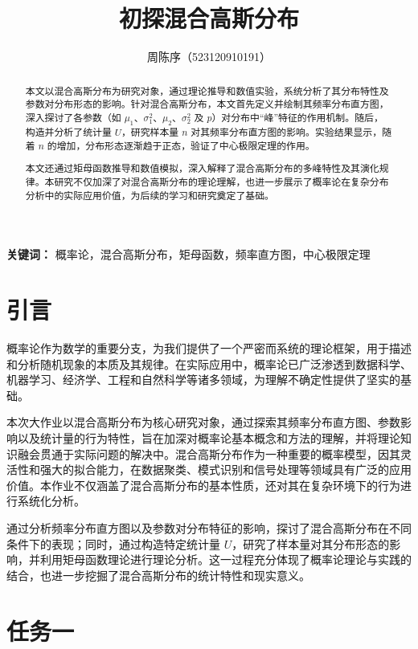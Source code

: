 \documentclass{article}
\title{初探混合高斯分布}
\author{周陈序（523120910191）}
\newcommand{\keywords}[1]{\textbf{关键词：} #1}
\begin{document}
\maketitle

\renewcommand{\abstractname}{摘要} %
\begin{abstract}

本文以混合高斯分布为研究对象，通过理论推导和数值实验，系统分析了其分布特性及参数对分布形态的影响。针对混合高斯分布，本文首先定义并绘制其频率分布直方图，深入探讨了各参数（如 \(\mu_1\)、\(\sigma_1^2\)、\(\mu_2\)、\(\sigma_2^2\) 及 \(p\)）对分布中“峰”特征的作用机制。随后，构造并分析了统计量 \( U \)，研究样本量 \( n \) 对其频率分布直方图的影响。实验结果显示，随着 \( n \) 的增加，分布形态逐渐趋于正态，验证了中心极限定理的作用。

本文还通过矩母函数推导和数值模拟，深入解释了混合高斯分布的多峰特性及其演化规律。本研究不仅加深了对混合高斯分布的理论理解，也进一步展示了概率论在复杂分布分析中的实际应用价值，为后续的学习和研究奠定了基础。

\end{abstract}

\keywords{概率论，混合高斯分布，矩母函数，频率直方图，中心极限定理}

\newpage
\tableofcontents
\newpage

\section{引言}

概率论作为数学的重要分支，为我们提供了一个严密而系统的理论框架，用于描述和分析随机现象的本质及其规律。在实际应用中，概率论已广泛渗透到数据科学、机器学习、经济学、工程和自然科学等诸多领域，为理解不确定性提供了坚实的基础。

本次大作业以混合高斯分布为核心研究对象，通过探索其频率分布直方图、参数影响以及统计量的行为特性，旨在加深对概率论基本概念和方法的理解，并将理论知识融会贯通于实际问题的解决中。混合高斯分布作为一种重要的概率模型，因其灵活性和强大的拟合能力，在数据聚类、模式识别和信号处理等领域具有广泛的应用价值。本作业不仅涵盖了混合高斯分布的基本性质，还对其在复杂环境下的行为进行系统化分析。

通过分析频率分布直方图以及参数对分布特征的影响，探讨了混合高斯分布在不同条件下的表现；同时，通过构造特定统计量 \( U \)，研究了样本量对其分布形态的影响，并利用矩母函数理论进行理论分析。这一过程充分体现了概率论理论与实践的结合，也进一步挖掘了混合高斯分布的统计特性和现实意义。


\section{任务一}
\end{document}
